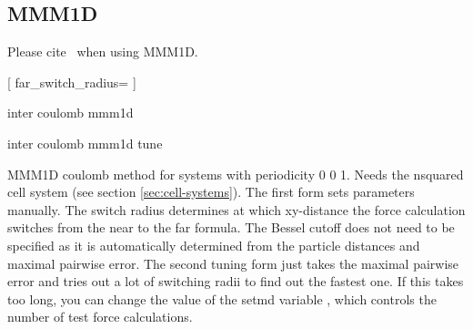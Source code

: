 \subsection{MMM1D}

\begin{citebox}
  Please cite~ when using MMM1D.
\end{citebox}
\begin{pysyntax}
	[
	far_switch_radius=
	]
	\begin{features}
		 
	\end{features}
\end{pysyntax}

\begin{essyntax}
  inter coulomb  mmm1d 

  inter coulomb  mmm1d tune 
  \begin{features}
  \end{features}
\end{essyntax}
MMM1D coulomb method for systems with periodicity 0 0 1. Needs the
nsquared cell system (see section \vref{sec:cell-systems}). The first
form sets parameters manually. The switch radius determines at which
xy-distance the force calculation switches from the near to the far
formula. The Bessel cutoff does not need to be specified as it is
automatically determined from the particle distances and maximal
pairwise error. The second tuning form just takes the
maximal pairwise error and tries out a lot of switching radii to find
out the fastest one. If this takes too long, you can change the value
of the setmd variable , which controls the number of
test force calculations.

